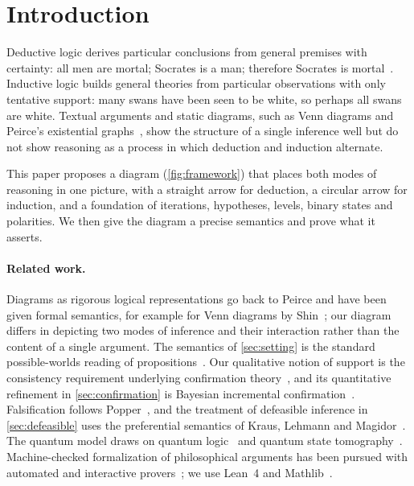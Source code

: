 \section{Introduction}\label{sec:intro}

Deductive logic derives particular conclusions from general premises with certainty: all men are
mortal; Socrates is a man; therefore Socrates is mortal~\cite{aristotle}. Inductive logic builds
general theories from particular observations with only tentative support: many swans have been
seen to be white, so perhaps all swans are white. Textual arguments and static diagrams, such as
Venn diagrams and Peirce's existential graphs~\cite{peirce}, show the structure of a single
inference well but do not show reasoning as a process in which deduction and induction alternate.

This paper proposes a diagram (\cref{fig:framework}) that places both modes of reasoning in one
picture, with a straight arrow for deduction, a circular arrow for induction, and a foundation of
iterations, hypotheses, levels, binary states and polarities. We then give the diagram a precise
semantics and prove what it asserts.

\paragraph{Related work.} Diagrams as rigorous logical representations go back to Peirce and
have been given formal semantics, for example for Venn diagrams by Shin~\cite{shin}; our diagram
differs in depicting two modes of inference and their interaction rather than the content of a
single argument. The semantics of \cref{sec:setting} is the standard possible-worlds
reading of propositions~\cite{kripke}. Our qualitative notion of support is the consistency
requirement underlying confirmation theory~\cite{hempel}, and its quantitative refinement in
\cref{sec:confirmation} is Bayesian incremental confirmation~\cite{carnap,earman,fitelson}.
Falsification follows Popper~\cite{popper}, and the treatment of defeasible inference in
\cref{sec:defeasible} uses the preferential semantics of Kraus, Lehmann and
Magidor~\cite{klm,makinson}. The quantum model draws on quantum logic~\cite{birkhoff,dallachiara}
and quantum state tomography~\cite{hradil,nielsen}. Machine-checked formalization of philosophical
arguments has been pursued with automated and interactive provers~\cite{fitelsonzalta,benzmuller};
we use Lean~4 and Mathlib~\cite{lean4,mathlib}.

